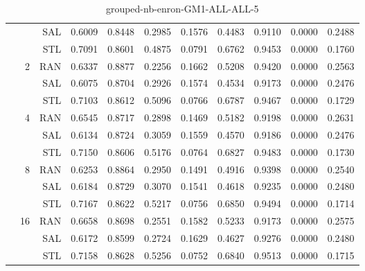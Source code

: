\begin{center}
\begin{table}[htbp]
\begin{center}
\begin{tabular}{ | r | r | r | r | r | r | r | r | r | r | r |}
 &   & SAL & 0.6009 & 0.8448 & 0.2985 & 0.1576 & 0.4483 & 0.9110 & 0.0000 & 0.2488\\ \cline{3-11}
 &   & STL & 0.7091 & 0.8601 & 0.4875 & 0.0791 & 0.6762 & 0.9453 & 0.0000 & 0.1760\\ \cline{2-11}
 & \multirow{3}{*}{2} & RAN & 0.6337 & 0.8877 & 0.2256 & 0.1662 & 0.5208 & 0.9420 & 0.0000 & 0.2563\\ \cline{3-11}
 &   & SAL & 0.6075 & 0.8704 & 0.2926 & 0.1574 & 0.4534 & 0.9173 & 0.0000 & 0.2476\\ \cline{3-11}
 &   & STL & 0.7103 & 0.8612 & 0.5096 & 0.0766 & 0.6787 & 0.9467 & 0.0000 & 0.1729\\ \cline{2-11}
 & \multirow{3}{*}{4} & RAN & 0.6545 & 0.8717 & 0.2898 & 0.1469 & 0.5182 & 0.9198 & 0.0000 & 0.2631\\ \cline{3-11}
 &   & SAL & 0.6134 & 0.8724 & 0.3059 & 0.1559 & 0.4570 & 0.9186 & 0.0000 & 0.2476\\ \cline{3-11}
 &   & STL & 0.7150 & 0.8606 & 0.5176 & 0.0764 & 0.6827 & 0.9483 & 0.0000 & 0.1730\\ \cline{2-11}
 & \multirow{3}{*}{8} & RAN & 0.6253 & 0.8864 & 0.2950 & 0.1491 & 0.4916 & 0.9398 & 0.0000 & 0.2540\\ \cline{3-11}
 &   & SAL & 0.6184 & 0.8729 & 0.3070 & 0.1541 & 0.4618 & 0.9235 & 0.0000 & 0.2480\\ \cline{3-11}
 &   & STL & 0.7167 & 0.8622 & 0.5217 & 0.0756 & 0.6850 & 0.9494 & 0.0000 & 0.1714\\ \cline{2-11}
 & \multirow{3}{*}{16} & RAN & 0.6658 & 0.8698 & 0.2551 & 0.1582 & 0.5233 & 0.9173 & 0.0000 & 0.2575\\ \cline{3-11}
 &   & SAL & 0.6172 & 0.8599 & 0.2724 & 0.1629 & 0.4627 & 0.9276 & 0.0000 & 0.2480\\ \cline{3-11}
 &   & STL & 0.7158 & 0.8628 & 0.5256 & 0.0752 & 0.6840 & 0.9513 & 0.0000 & 0.1715\\ \cline{2-11}
\hline
\end{tabular}
\caption{grouped-nb-enron-GM1-ALL-ALL-5}
\end{center}
 \end{table}
\end{center}

